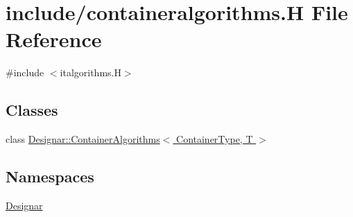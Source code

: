 \hypertarget{containeralgorithms_8_h}{}\section{include/containeralgorithms.H File Reference}
\label{containeralgorithms_8_h}
{\ttfamily \#include $<$italgorithms.\+H$>$}\newline
\subsection*{Classes}
\begin{DoxyCompactItemize}
\item 
class \hyperlink{class_designar_1_1_container_algorithms}{Designar\+::\+Container\+Algorithms$<$ Container\+Type, T $>$}
\end{DoxyCompactItemize}
\subsection*{Namespaces}
\begin{DoxyCompactItemize}
\item 
 \hyperlink{namespace_designar}{Designar}
\end{DoxyCompactItemize}
